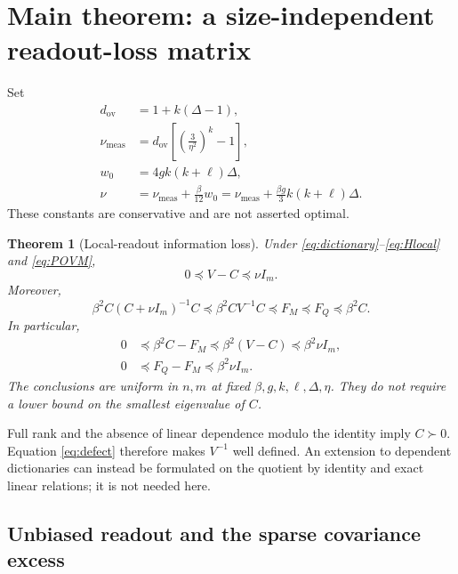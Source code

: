 \documentclass[11pt,a4paper]{article}
\newtheorem{theorem}{Theorem}[section]
\theoremstyle{remark}
\begin{document}
\section{Main theorem: a size-independent readout-loss matrix}

Set
\begin{align}
 d_{\mathrm{ov}}&=1+k(\Delta-1),\\
 \nu_{\mathrm{meas}}&=d_{\mathrm{ov}}\left[\left(\frac3{\eta^2}\right)^k-1\right],\\
 w_0&=4gk(k+\ell)\Delta,\\
 \nu&=\nu_{\mathrm{meas}}+\frac\beta{12}w_0
 =\nu_{\mathrm{meas}}+\frac{\beta g}{3}k(k+\ell)\Delta.
 \label{eq:nu}
\end{align}
These constants are conservative and are not asserted optimal.

\begin{theorem}[Local-readout information loss]\label{thm:main}
Under \eqref{eq:dictionary}--\eqref{eq:Hlocal} and \eqref{eq:POVM},
\begin{equation}
 0\preceq V-C\preceq\nu I_m.
 \label{eq:defect}
\end{equation}
Moreover,
\begin{equation}
 \beta^2 C(C+\nu I_m)^{-1}C
 \preceq \beta^2CV^{-1}C
 \preceq F_M\preceq F_Q\preceq\beta^2C.
 \label{eq:chain}
\end{equation}
In particular,
\begin{align}
 0&\preceq\beta^2C-F_M\preceq\beta^2(V-C)\preceq\beta^2\nu I_m,\label{eq:lossBKM}\\
 0&\preceq F_Q-F_M\preceq\beta^2\nu I_m.
 \label{eq:lossQ}
\end{align}
The conclusions are uniform in $n,m$ at fixed $\beta,g,k,\ell,\Delta,\eta$. They do not require a lower bound on the smallest eigenvalue of $C$.
\end{theorem}

Full rank and the absence of linear dependence modulo the identity imply $C\succ0$. Equation \eqref{eq:defect} therefore makes $V^{-1}$ well defined. An extension to dependent dictionaries can instead be formulated on the quotient by identity and exact linear relations; it is not needed here.

\subsection{Unbiased readout and the sparse covariance excess}
\end{document}
